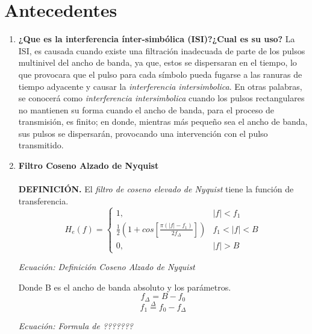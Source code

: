 \documentclass[lettersize,journal]{IEEEtran}
\begin{document}
\section{Antecedentes}\label{sec:Marcoteorico}

\begin{enumerate}
    \item \textbf{¿Que es la interferencia ínter-simbólica (ISI)?¿Cual es su uso?} \newline \newline 
La ISI, es causada cuando existe una filtración inadecuada de parte de los pulsos multinivel del ancho de banda, ya que, estos se dispersaran en el tiempo, lo que provocara que el pulso para cada símbolo pueda fugarse a las ranuras de tiempo adyacente y causar la \textit{interferencia intersimbolica}.
\newline \newline
En otras palabras, se conocerá como \textit{interferencia intersimbolica} cuando los pulsos rectangulares no mantienen su forma cuando el ancho de banda, para el proceso de transmisión, es finito; en donde, mientras más pequeño sea el ancho de banda, sus pulsos se dispersarán, provocando una intervención con el pulso transmitido. \newline

\item \textbf{Filtro Coseno Alzado de Nyquist}\\\\
\textbf{DEFINICIÓN.} El \textit{filtro de coseno elevado de Nyquist} tiene la función de transferencia.
    \begin{equation}
        H_{e}(f)= \left\{\begin{array}{lcc}
             1, & |f| < f_{1} \\
             \frac{1}{2} (1 + cos[\frac{\pi(|f|-f_{1})}{2 f_{\Delta}}]) & f_{1}<|f|< B \\
             0, & |f| > B
        \end{array}
        \right.
    \end{equation}
\begin{center}
    \textit{Ecuación: Definición Coseno Alzado de Nyquist}
\end{center}

Donde B es el ancho de banda absoluto y los parámetros.\\

\begin{equation}
    f_{\Delta} = B - f_0
\end{equation}
\begin{equation}
    f_{1} \overset{\Delta}{=} f_{0} - f_{\Delta} 
\end{equation}
\begin{center}
    \textit{Ecuación: Formula de ???????}    
\end{center}


\end{enumerate}
\end{document}
